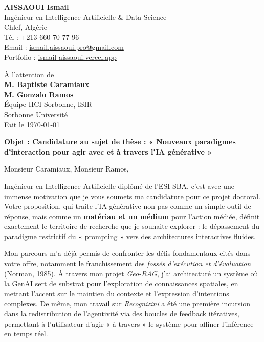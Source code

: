\documentclass[a4paper,11pt]{article}
\begin{document}
\begin{flushleft}
    \textbf{AISSAOUI Ismail} \\
    Ingénieur en Intelligence Artificielle \& Data Science \\
    Chlef, Algérie \\
    Tél : +213 660 70 77 96 \\
    Email : \href{mailto:ismail.aissaoui.pro@gmail.com}{ismail.aissaoui.pro@gmail.com} \\
    Portfolio : \href{https://ismail-aissaoui.vercel.app}{ismail-aissaoui.vercel.app}
\end{flushleft}

\begin{flushright}
    À l'attention de \\
    \textbf{M. Baptiste Caramiaux} \\
    \textbf{M. Gonzalo Ramos} \\
    Équipe HCI Sorbonne, ISIR \\
    Sorbonne Université \\
    Fait le \today
\end{flushright}

\vspace{0.4cm}

\noindent \textbf{Objet : Candidature au sujet de thèse : « Nouveaux paradigmes d’interaction pour agir avec et à travers l’IA générative »}

\vspace{0.4cm}

Monsieur Caramiaux, Monsieur Ramos,

\medskip

Ingénieur en Intelligence Artificielle diplômé de l'ESI-SBA, c'est avec une immense motivation que je vous soumets ma candidature pour ce projet doctoral. Votre proposition, qui traite l'IA générative non pas comme un simple outil de réponse, mais comme un \textbf{matériau et un médium} pour l'action médiée, définit exactement le territoire de recherche que je souhaite explorer : le dépassement du paradigme restrictif du « prompting » vers des architectures interactives fluides.

Mon parcours m'a déjà permis de confronter les défis fondamentaux cités dans votre offre, notamment le franchissement des \textit{fossés d'exécution et d'évaluation} (Norman, 1985). À travers mon projet \textit{Geo-RAG}, j'ai architecturé un système où la GenAI sert de substrat pour l'exploration de connaissances spatiales, en mettant l'accent sur le maintien du contexte et l'expression d'intentions complexes. De même, mon travail sur \textit{Recognizini} a été une première incursion dans la redistribution de l'agentivité via des boucles de feedback itératives, permettant à l'utilisateur d'agir « à travers » le système pour affiner l'inférence en temps réel.
\end{document}
